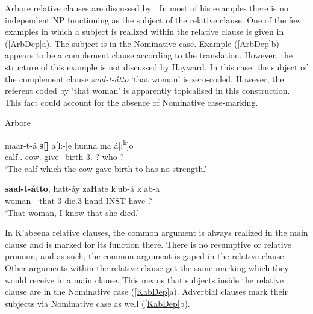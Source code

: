 Arbore relative clauses are discussed by \citet[314]{Hayward:1984}. 
In most of his examples there is no independent NP functioning as the subject of the relative clause. 
One of the few examples in which a subject is realized within the relative clause is given in (\ref{ArbDep}a). 
The subject is in the Nominative  case. 
Example (\ref{ArbDep}b) appears to be a complement clause according to the translation. 
However, the structure of this example is not discussed by Hayward. 
In this case, the subject of the complement clause \emph{saal-t-\'atto} `that woman' is zero-coded. 
However, the referent coded by `that woman' is apparently topicalised in this construction. 
This fact could account for the absence of Nominative case-marking.

\begin{exe}\ex\label{ArbDep} {Arbore} \citep[Eastern Cushitic; Ethiopia; ][318, 321]{Hayward:1984}\nopagebreak[4]
\begin{xlist}
\ex\gll maar-t-\'a \textbf{s[\textglotstop{}]} a[l:-]e hunna ma \'a[:\textsuperscript{h}]o\\
calf.\fem{}.\nom{} cow.\nom{} give\_birth-3\sg{}.\pfv{} ? who ? \\
`The calf which the cow gave birth to has no strength.'

\ex\gll \textbf{saal-t-\'atto}, hatt-\'ay zaHate k'ub-\'a k'ab-a\\
woman-\fem{}-\dist{} that-3\sg{} die.3\sg{} hand-INST have-? \\
`That woman, I know that she died.' %
\end{xlist}
\end{exe}	

In K'abeena relative clauses, the common argument is always realized in the main clause and is marked for its function there.  
There is no resumptive or relative pronoun, and as such, the common argument is gaped in the  relative clause. 
Other arguments within the relative clause get the same marking which they would receive in a main clause.
This means that subjects inside the relative clause are in the Nominative  case (\ref{KabDep}a).
Adverbial clauses mark their subjects via Nominative  case as well (\ref{KabDep}b).

